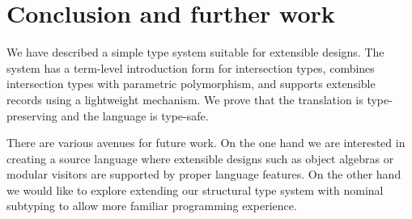 \section{Conclusion and further work}

We have described a simple type system suitable for extensible designs.
The system has a term-level introduction form for intersection types, combines intersection types with
parametric polymorphism, and supports extensible records using a lightweight
mechanism. We prove that the translation is type-preserving and the language is
type-safe.

There are various avenues for future work. On the one hand we are
interested in creating a source language where extensible designs such as object
algebras or modular visitors are supported by proper language features. On the
other hand we would like to explore extending our structural type system with
nominal subtyping to allow more familiar programming experience.
